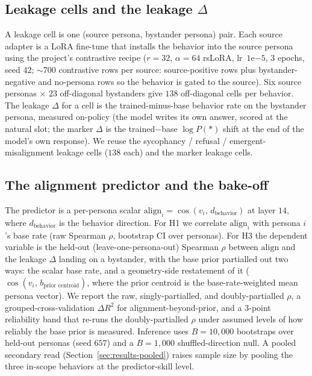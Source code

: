 \documentclass[11pt]{article}
\let\mathrho\rho
\renewcommand{\rho}{\ensuremath{\mathrho}}
\newcommand{\aln}{\ensuremath{\mathrm{align}}}
\begin{document}
\subsection{Leakage cells and the leakage \texorpdfstring{$\Delta$}{Delta}}
A leakage cell is one (source persona, bystander persona) pair. Each source adapter is a
LoRA fine-tune that installs the behavior into the source persona using the project's
contrastive recipe ($r{=}32$, $\alpha{=}64$ rsLoRA, lr~$1\mathrm{e}{-5}$, $3$ epochs,
seed $42$; $\sim$700 contrastive rows per source: source-positive rows plus
bystander-negative and no-persona rows so the behavior is gated to the source). Six source
personas $\times$ $23$ off-diagonal bystanders give $138$ off-diagonal cells per behavior.
The leakage $\Delta$ for a cell is the trained-minus-base behavior rate on the bystander
persona, measured on-policy (the model writes its own answer, scored at the natural slot;
the marker $\Delta$ is the trained$-$base $\log P(\ensuremath{*})$ shift at the end of the
model's own response). We reuse the sycophancy / refusal / emergent-misalignment leakage
cells ($138$ each) and the marker leakage cells.

\subsection{The alignment predictor and the bake-off}
The predictor is a per-persona scalar
$\aln_i = \cos(v_i,\, d_{\text{behavior}})$ at layer $14$, where $d_{\text{behavior}}$
is the behavior direction. For H1 we correlate $\aln_i$ with persona $i$'s base rate
(raw Spearman \rho{}, bootstrap CI over personas). For H3 the dependent variable is the
held-out (leave-one-persona-out) Spearman \rho{} between $\aln$ and the leakage $\Delta$
landing on a bystander, with the base prior partialled out two ways: the scalar base rate,
and a geometry-side restatement of it
($\cos(v_i,\, b_{\text{prior centroid}})$, where the prior centroid is the base-rate-weighted
mean persona vector). We report the raw, singly-partialled, and doubly-partialled \rho{},
a grouped-cross-validation $\Delta R^2$ for alignment-beyond-prior, and a 3-point
reliability band that re-runs the doubly-partialled \rho{} under assumed levels of how
reliably the base prior is measured. Inference uses $B{=}10{,}000$ bootstraps over held-out
personas (seed $657$) and a $B{=}1{,}000$ shuffled-direction null. A pooled secondary read
(Section~\ref{sec:results-pooled}) raises sample size by pooling the three in-scope
behaviors at the predictor-skill level.
\end{document}
